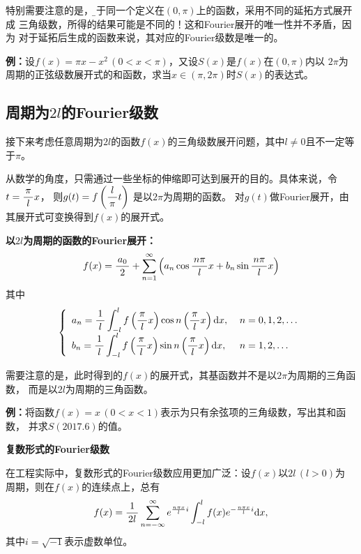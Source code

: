 特别需要注意的是，{\b 对于同一个定义在$(0,\pi)$上的函数，采用不同的延拓方式展开成
三角级数，所得的结果可能是不同的！这和Fourier展开的唯一性并不矛盾，因为
对于延拓后生成的函数来说，其对应的Fourier级数是唯一的。}

{\bf 例：}设$f(x)=\pi x-x^2\,(0<x<\pi)$，又设$S(x)$是$f(x)$在$(0,\pi)$内以
$2\pi$为周期的正弦级数展开式的和函数，求当$x\in(\pi,2\pi)$时$S(x)$的表达式。

\subsection{周期为$2l$的Fourier级数}

接下来考虑任意周期为$2l$的函数$f(x)$的三角级数展开问题，其中$l\ne0$且不一定等于$\pi$。

从数学的角度，只需通过一些坐标的伸缩即可达到展开的目的。具体来说，令$t=\df{\pi}{l}x$，
则$g(t)=f\left(\df{l}{\pi}t\right)$ 是以$2\pi$为周期的函数。 
对$g(t)$做Fourier展开，由其展开式可变换得到$f(x)$的展开式。

\begin{thx}
	{\bf 以$2l$为周期的函数的Fourier展开：}
	$$f(x)=\df{a_0}2+\sumn\left(a_n\cos\df{n\pi}lx+b_n\sin\df{n\pi}lx\right)$$
	其中
	$$\left\{\begin{array}{ll}
	a_n=\df1{l}\dint_{-l}^{l}f\left(\df{\pi}lx\right)
	\cos n\left(\df{\pi}lx\right)\d x,\;&
	n=0,1,2,\ldots\\[5pt] b_n=\df1{l}\dint_{-l}^{l}f\left(\df{\pi}lx\right)
	\sin n\left(\df{\pi}lx\right)\d x,\;& n=1,2,\ldots
	\end{array}\right.$$
\end{thx}

需要注意的是，此时得到的$f(x)$的展开式，其基函数并不是以$2\pi$为周期的三角函数，
而是以$2l$为周期的三角函数。

{\bf 例：}将函数$f(x)=x\,(0<x<1)$表示为只有余弦项的三角级数，写出其和函数，
并求$S(2017.6)$的值。

\begin{shaded}
	{\bf 复数形式的Fourier级数}
	
	在工程实际中，复数形式的Fourier级数应用更加广泛：设$f(x)$以$2l\,(l>0)$为
	周期，则在$f(x)$的连续点上，总有
	$$f(x)=\df1{2l}\sumn[-\infty]e^{\frac{n\pi x}li}
	\dint_{-l}^lf(x)e^{-\frac{n\pi x}li}\d x,$$
	其中$i=\sqrt{-1}$表示虚数单位。
\end{shaded}

